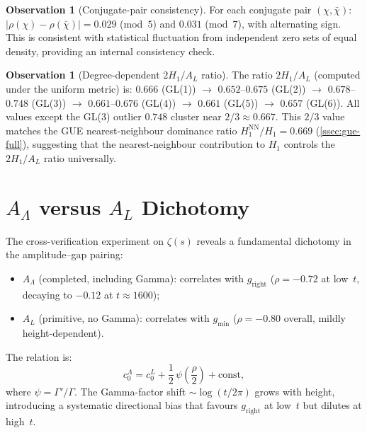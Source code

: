 \documentclass[11pt,a4paper]{article}
\theoremstyle{plain}
\theoremstyle{definition}
\newtheorem{observation}[theorem]{Observation}
\newcommand{\La}{\Lambda}
\begin{document}
\begin{observation}[Conjugate-pair consistency]\label{obs:conjugate}
For each conjugate pair $(\chi, \bar{\chi})$:
$|\rho(\chi) - \rho(\bar{\chi})| = 0.029$ (mod~$5$)
and $0.031$ (mod~$7$), with alternating sign.
This is consistent with statistical fluctuation from independent
zero sets of equal density, providing an internal consistency check.
\end{observation}

\begin{observation}[Degree-dependent $2H_1/A_L$ ratio]\label{obs:h1_ratio}
The ratio $2H_1/A_L$ (computed under the uniform metric) is:
$0.666$ (GL(1)) $\to$ $0.652$--$0.675$ (GL(2)) $\to$
$0.678$--$0.748$ (GL(3)) $\to$
$0.661$--$0.676$ (GL(4)) $\to$ $0.661$ (GL(5)) $\to$ $0.657$ (GL(6)).
All values except the GL(3) outlier $0.748$ cluster near
$2/3 \approx 0.667$.  This $2/3$ value matches the GUE
nearest-neighbour dominance ratio $H_1^{\mathrm{NN}}/H_1 = 0.669$
(\cref{ssec:gue-full}), suggesting that the nearest-neighbour
contribution to $H_1$ controls the $2H_1/A_L$ ratio universally.
\end{observation}


\section{$A_\La$ versus $A_L$ Dichotomy}
\label{sec:dichotomy}

The cross-verification experiment on $\zeta(s)$ reveals a
fundamental dichotomy in the amplitude--gap pairing:
\begin{itemize}
  \item $A_\La$ (completed, including Gamma): correlates with
        $g_{\mathrm{right}}$ ($\rho = -0.72$ at low~$t$,
        decaying to $-0.12$ at $t \approx 1600$);
  \item $A_L$ (primitive, no Gamma): correlates with $g_{\min}$
        ($\rho = -0.80$ overall, mildly height-dependent).
\end{itemize}

The relation is:
\begin{equation}\label{eq:AL_ALambda}
  c_0^\La = c_0^L + \frac{1}{2}\,\psi\!\left(\frac{\rho}{2}\right)
  + \text{const},
\end{equation}
where $\psi = \Gamma'/\Gamma$.  The Gamma-factor shift
$\sim \log(t/2\pi)$ grows with height, introducing a
systematic directional bias that favours $g_{\mathrm{right}}$ at
low~$t$ but dilutes at high~$t$.
\end{document}
